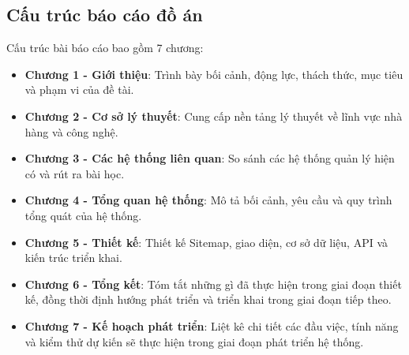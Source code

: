 \subsection{Cấu trúc báo cáo đồ án}
Cấu trúc bài báo cáo bao gồm 7 chương:
\begin{itemize}
    \item \textbf{Chương 1 - Giới thiệu}: Trình bày bối cảnh, động lực, thách thức, mục tiêu và phạm vi của đề tài.
    \item \textbf{Chương 2 - Cơ sở lý thuyết}: Cung cấp nền tảng lý thuyết về lĩnh vực nhà hàng và công nghệ.
    \item \textbf{Chương 3 - Các hệ thống liên quan}: So sánh các hệ thống quản lý hiện có và rút ra bài học.
    \item \textbf{Chương 4 - Tổng quan hệ thống}: Mô tả bối cảnh, yêu cầu và quy trình tổng quát của hệ thống.
    \item \textbf{Chương 5 - Thiết kế}: Thiết kế Sitemap, giao diện, cơ sở dữ liệu, API và kiến trúc triển khai.
    \item \textbf{Chương 6 - Tổng kết}: Tóm tắt những gì đã thực hiện trong giai đoạn thiết kế, đồng thời định hướng phát triển và triển khai trong giai đoạn tiếp theo.
    \item \textbf{Chương 7 - Kế hoạch phát triển}: Liệt kê chi tiết các đầu việc, tính năng và kiểm thử dự kiến sẽ thực hiện trong giai đoạn phát triển hệ thống.
\end{itemize}
